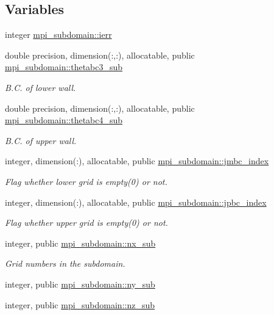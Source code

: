 \subsection*{Variables}
\begin{DoxyCompactItemize}
\item 
integer \hyperlink{namespacempi__subdomain_acd16f258caed20a7d8d38cd28ae64688}{mpi\+\_\+subdomain\+::ierr}
\item 
double precision, dimension(\+:,\+:), allocatable, public \hyperlink{namespacempi__subdomain_ad61f27caf5f32301a077e21363c2d73b}{mpi\+\_\+subdomain\+::thetabc3\+\_\+sub}
\begin{DoxyCompactList}\small\item\em B.\+C. of lower wall. \end{DoxyCompactList}\item 
double precision, dimension(\+:,\+:), allocatable, public \hyperlink{namespacempi__subdomain_ad1705bede0c0d39ad16f9f94afe32be6}{mpi\+\_\+subdomain\+::thetabc4\+\_\+sub}
\begin{DoxyCompactList}\small\item\em B.\+C. of upper wall. \end{DoxyCompactList}\item 
integer, dimension(\+:), allocatable, public \hyperlink{namespacempi__subdomain_ac22380b1c941dd6c53cabe7287d185e9}{mpi\+\_\+subdomain\+::jmbc\+\_\+index}
\begin{DoxyCompactList}\small\item\em Flag whether lower grid is empty(0) or not. \end{DoxyCompactList}\item 
integer, dimension(\+:), allocatable, public \hyperlink{namespacempi__subdomain_a9adbfdd11c7e9fdb968bb8eef2b13c2b}{mpi\+\_\+subdomain\+::jpbc\+\_\+index}
\begin{DoxyCompactList}\small\item\em Flag whether upper grid is empty(0) or not. \end{DoxyCompactList}\end{DoxyCompactItemize}
\textbf{ }\par
\begin{DoxyCompactItemize}
\item 
integer, public \hyperlink{namespacempi__subdomain_a005fe127fe0fc85b932814a820a36444}{mpi\+\_\+subdomain\+::nx\+\_\+sub}
\begin{DoxyCompactList}\small\item\em Grid numbers in the subdomain. \end{DoxyCompactList}\item 
integer, public \hyperlink{namespacempi__subdomain_a665ba05d0ae9309dd28b9b513a0c87a1}{mpi\+\_\+subdomain\+::ny\+\_\+sub}
\item 
integer, public \hyperlink{namespacempi__subdomain_a07555cc931ac78376a4c81207662251f}{mpi\+\_\+subdomain\+::nz\+\_\+sub}
\end{DoxyCompactItemize}

